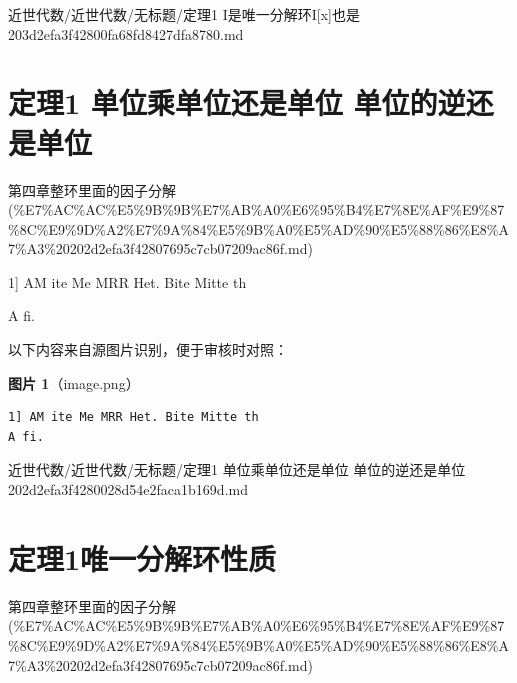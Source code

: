 \begin{note}[来源路径]

近世代数/近世代数/无标题/定理1 I是唯一分解环I[x]也是 203d2efa3f42800fa68fd8427dfa8780.md

\end{note}

\section*{定理1 单位乘单位还是单位 单位的逆还是单位}

\begin{note}[来源上级主题]

第四章整环里面的因子分解 (\%E7\%AC\%AC\%E5\%9B\%9B\%E7\%AB\%A0\%E6\%95\%B4\%E7\%8E\%AF\%E9\%87\%8C\%E9\%9D\%A2\%E7\%9A\%84\%E5\%9B\%A0\%E5\%AD\%90\%E5\%88\%86\%E8\%A7\%A3\%20202d2efa3f42807695c7cb07209ac86f.md)

\end{note}

\begin{theorem}

1] AM ite Me MRR Het. Bite Mitte th

A fi.

\end{theorem}

\begin{note}
以下内容来自源图片识别，便于审核时对照：

\textbf{图片 1}（image.png）
\begin{Verbatim}[fontsize=\small]
1] AM ite Me MRR Het. Bite Mitte th
A fi.
\end{Verbatim}

\end{note}

\begin{note}[来源路径]

近世代数/近世代数/无标题/定理1 单位乘单位还是单位 单位的逆还是单位 202d2efa3f4280028d54e2faca1b169d.md

\end{note}

\section*{定理1唯一分解环性质}

\begin{note}[来源上级主题]

第四章整环里面的因子分解 (\%E7\%AC\%AC\%E5\%9B\%9B\%E7\%AB\%A0\%E6\%95\%B4\%E7\%8E\%AF\%E9\%87\%8C\%E9\%9D\%A2\%E7\%9A\%84\%E5\%9B\%A0\%E5\%AD\%90\%E5\%88\%86\%E8\%A7\%A3\%20202d2efa3f42807695c7cb07209ac86f.md)

\end{note}

